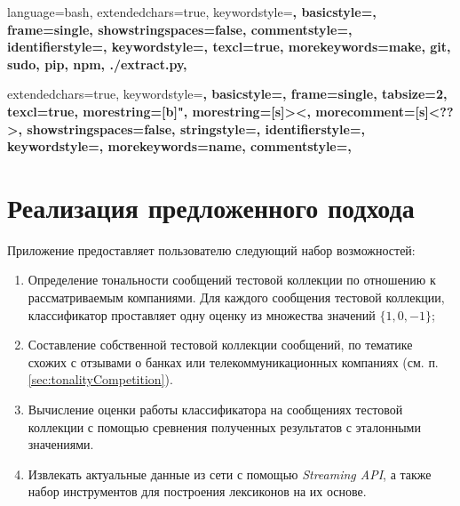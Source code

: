 
{
    language=bash,
    extendedchars=true,
    keywordstyle=\bfseries,
    basicstyle=\footnotesize,
    frame=single,
    showstringspaces=false,
    commentstyle=\color{red},
    identifierstyle=\color{black},
    keywordstyle=\color{blue},
    texcl=true,
    morekeywords={make, git, sudo, pip, npm, ./extract.py},
}

{
    extendedchars=true,
    keywordstyle=\bfseries,
    basicstyle=\footnotesize,
    frame=single,
    tabsize=2,
    texcl=true,
    morestring=[b]",
    morestring=[s]{>}{<},
    morecomment=[s]{<?}{?>},
    showstringspaces=false,
    stringstyle=\color{black},
    identifierstyle=\color{darkblue},
    keywordstyle=\color{cyan},
    morekeywords={name},
    commentstyle=\color{gray},
}
\newcommand\xml{{\it XML }}

\newpage
\section{Реализация предложенного подхода}
    Приложение предоставляет пользователю следующий набор возможностей:
    \begin{enumerate}
        \item Определение тональности сообщений тестовой коллекции по отношению к
        рассматриваемым компаниями. Для каждого сообщения тестовой коллекции,
        классификатор проставляет одну оценку из множества значений $\{1, 0, -1\}$;
        \item Составление собственной тестовой коллекции сообщений, по тематике
        схожих с отзывами о банках или телекоммуникационных компаниях
        (см. п. \ref{sec:tonalityCompetition}).
        \item Вычисление оценки работы классификатора на сообщениях тестовой
        коллекции с помощью сревнения полученных результатов с эталонными значениями.
        \item Извлекать актуальные данные из сети \twitter с помощью
        {\it Streaming API}, а также набор инструментов для построения лексиконов
        на их основе.
    \end{enumerate}

